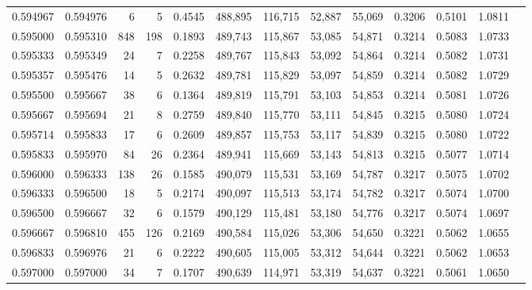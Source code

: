 \begin{tabular}{rrrrrrrrrrrrr}
0.594967 & 0.594976 &     6 &   5 &                                     0.4545 & 488,895 & 116,715 &  52,887 &  55,069 & 0.3206 & 0.5101 & 1.0811 \\
0.595000 & 0.595310 &   848 & 198 &                                     0.1893 & 489,743 & 115,867 &  53,085 &  54,871 & 0.3214 & 0.5083 & 1.0733 \\
0.595333 & 0.595349 &    24 &   7 &                                     0.2258 & 489,767 & 115,843 &  53,092 &  54,864 & 0.3214 & 0.5082 & 1.0731 \\
0.595357 & 0.595476 &    14 &   5 &                                     0.2632 & 489,781 & 115,829 &  53,097 &  54,859 & 0.3214 & 0.5082 & 1.0729 \\
0.595500 & 0.595667 &    38 &   6 &                                     0.1364 & 489,819 & 115,791 &  53,103 &  54,853 & 0.3214 & 0.5081 & 1.0726 \\
0.595667 & 0.595694 &    21 &   8 &                                     0.2759 & 489,840 & 115,770 &  53,111 &  54,845 & 0.3215 & 0.5080 & 1.0724 \\
0.595714 & 0.595833 &    17 &   6 &                                     0.2609 & 489,857 & 115,753 &  53,117 &  54,839 & 0.3215 & 0.5080 & 1.0722 \\
0.595833 & 0.595970 &    84 &  26 &                                     0.2364 & 489,941 & 115,669 &  53,143 &  54,813 & 0.3215 & 0.5077 & 1.0714 \\
0.596000 & 0.596333 &   138 &  26 &                                     0.1585 & 490,079 & 115,531 &  53,169 &  54,787 & 0.3217 & 0.5075 & 1.0702 \\
0.596333 & 0.596500 &    18 &   5 &                                     0.2174 & 490,097 & 115,513 &  53,174 &  54,782 & 0.3217 & 0.5074 & 1.0700 \\
0.596500 & 0.596667 &    32 &   6 &                                     0.1579 & 490,129 & 115,481 &  53,180 &  54,776 & 0.3217 & 0.5074 & 1.0697 \\
0.596667 & 0.596810 &   455 & 126 &                                     0.2169 & 490,584 & 115,026 &  53,306 &  54,650 & 0.3221 & 0.5062 & 1.0655 \\
0.596833 & 0.596976 &    21 &   6 &                                     0.2222 & 490,605 & 115,005 &  53,312 &  54,644 & 0.3221 & 0.5062 & 1.0653 \\
0.597000 & 0.597000 &    34 &   7 &                                     0.1707 & 490,639 & 114,971 &  53,319 &  54,637 & 0.3221 & 0.5061 & 1.0650 \\

\end{tabular}
